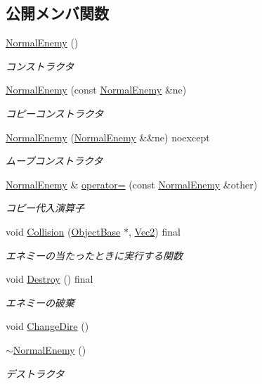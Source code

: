 \subsection*{公開メンバ関数}
\begin{DoxyCompactItemize}
\item 
\mbox{\hyperlink{class_normal_enemy_aa386eea59a2983574fe7d55a91f93012}{Normal\+Enemy}} ()
\begin{DoxyCompactList}\small\item\em コンストラクタ \end{DoxyCompactList}\item 
\mbox{\hyperlink{class_normal_enemy_a08bfcea97297d0cff5c10854c8f5ffb8}{Normal\+Enemy}} (const \mbox{\hyperlink{class_normal_enemy}{Normal\+Enemy}} \&ne)
\begin{DoxyCompactList}\small\item\em コピーコンストラクタ \end{DoxyCompactList}\item 
\mbox{\hyperlink{class_normal_enemy_a64edfeecedfae67d33a5e1fcdccbbfa6}{Normal\+Enemy}} (\mbox{\hyperlink{class_normal_enemy}{Normal\+Enemy}} \&\&ne) noexcept
\begin{DoxyCompactList}\small\item\em ムーブコンストラクタ \end{DoxyCompactList}\item 
\mbox{\hyperlink{class_normal_enemy}{Normal\+Enemy}} \& \mbox{\hyperlink{class_normal_enemy_a4294020d85d9ae77a47294e04fd048b6}{operator=}} (const \mbox{\hyperlink{class_normal_enemy}{Normal\+Enemy}} \&other)
\begin{DoxyCompactList}\small\item\em コピー代入演算子 \end{DoxyCompactList}\item 
void \mbox{\hyperlink{class_normal_enemy_a71cb11fe60d713ce638dcec5d66912e6}{Collision}} (\mbox{\hyperlink{class_object_base}{Object\+Base}} $\ast$, \mbox{\hyperlink{common_8h_ae148fff5818e9444b4ab2288829559bf}{Vec2}}) final
\begin{DoxyCompactList}\small\item\em エネミーの当たったときに実行する関数 \end{DoxyCompactList}\item 
void \mbox{\hyperlink{class_normal_enemy_a8a4271b6da6c7679d134d1c08125815b}{Destroy}} () final
\begin{DoxyCompactList}\small\item\em エネミーの破棄 \end{DoxyCompactList}\item 
void \mbox{\hyperlink{class_normal_enemy_a9fe91caeeb6d9882e108c8c0d9d404c1}{Change\+Dire}} ()
\item 
\mbox{\hyperlink{class_normal_enemy_adc9a3115b2494739261b5cc363c11c32}{$\sim$\+Normal\+Enemy}} ()
\begin{DoxyCompactList}\small\item\em デストラクタ \end{DoxyCompactList}\end{DoxyCompactItemize}
